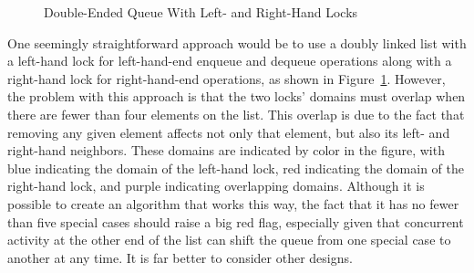 \begin{figure}[tb]
\begin{center}
\end{center}
\caption{Double-Ended Queue With Left- and Right-Hand Locks}
\label{fig:SMPdesign:Double-Ended Queue With Left- and Right-Hand Locks}
\end{figure}

One seemingly straightforward approach would be to use a doubly
linked list with a left-hand lock
for left-hand-end enqueue and dequeue operations along with a right-hand
lock for right-hand-end operations, as shown in
Figure~\ref{fig:SMPdesign:Double-Ended Queue With Left- and Right-Hand Locks}.
However, the problem with this approach is that the two locks'
domains must overlap when there are fewer than four elements on the
list.
This overlap is due to the fact that removing any given element affects
not only that element, but also its left- and right-hand neighbors.
These domains are indicated by color in the figure, with blue indicating
the domain of the left-hand lock, red indicating the domain of the right-hand
lock, and purple indicating overlapping domains.
Although it is possible to create an algorithm that works this way,
the fact that it has no fewer than five special cases should raise
a big red flag, especially given that concurrent activity at the other
end of the list can shift the queue from one special case to another
at any time.
It is far better to consider other designs.

